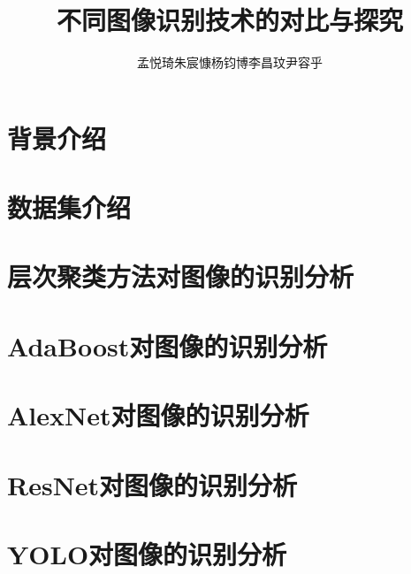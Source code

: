 \documentclass[UTF8]{ctexart}
\title{不同图像识别技术的对比与探究}
\author{孟悦琦\quad 朱宸慷\quad 杨钧博\quad 李昌玟\quad 尹容乎}
\begin{document}
\maketitle

\section{背景介绍}


\section{数据集介绍}



\section{层次聚类方法对图像的识别分析}


\section{AdaBoost对图像的识别分析}


\section{AlexNet对图像的识别分析}


\section{ResNet对图像的识别分析}


\section{YOLO对图像的识别分析}






\newpage
\small



\end{document}

